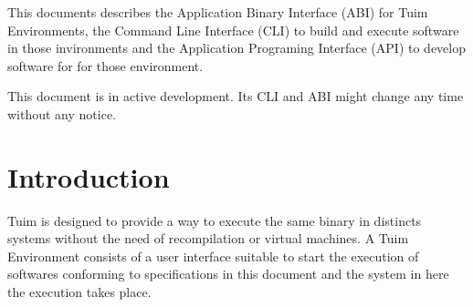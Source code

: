 \documentclass[
   article,                      %
   10pt,                         %
   openright,                    %
   oneside,                      %
   a4paper,                      %
   sumario = tradicional,        %
   english,                      %
   xcolor=table                  %
]{abntex2}
\begin{document}
\maketitle

\begin{resumoumacoluna}
   This documents describes the Application Binary Interface (ABI)
   for Tuim Environments\cite{tuim},
   the Command Line Interface (CLI)
   to build and execute software in those invironments
   and the Application Programing Interface (API)
   to develop software for for those environment.

   This document is in active development.
   Its CLI and ABI might change any time without any notice.
\end{resumoumacoluna}



\newpage
\tableofcontents
\newpage
\textual

\section{Introduction}

Tuim is designed to provide a way to execute the same binary in distincts systems
without the need of recompilation or virtual machines.
A Tuim Environment consists of a user interface suitable to start the execution
of softwares conforming to specifications in this document
and the system in here the execution takes place.
\end{document}
